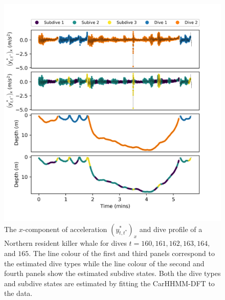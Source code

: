 \begin{figure}[ht]
	\centering
	\includegraphics[width=5in]{../Plots/CarHHMM2_decoded_dives.png}
	\caption{The $x$-component of acceleration $\left(y^*_{t,t^*}\right)_x$ and dive profile of a Northern resident killer whale for dives $t = 160,161,162,163,164,$ and $165$. The line colour of the first and third panels correspond to the estimated dive types while the line colour of the second and fourth panels show the estimated subdive states. Both the dive types and subdive states are estimated by fitting the CarHHMM-DFT to the data.}
	\label{fig:labeled_dives}
\end{figure}


